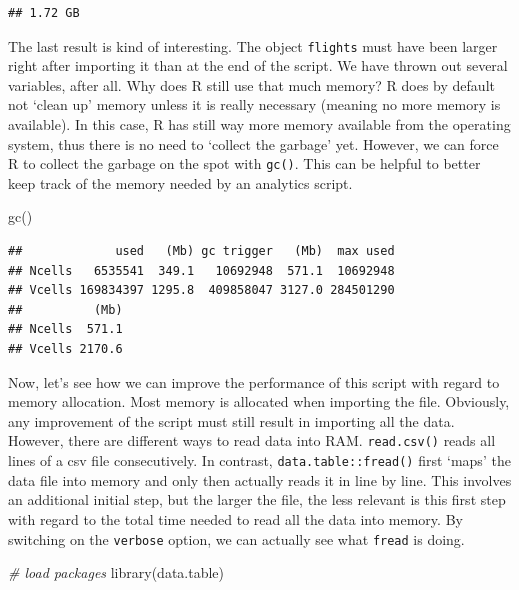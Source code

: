 \documentclass[
  12pt,
]{style/krantz}
\newenvironment{Shaded}{\begin{snugshade}}{\end{snugshade}}
\newcommand{\CommentTok}[1]{\textcolor[rgb]{0.56,0.35,0.01}{\textit{#1}}}
\newcommand{\FunctionTok}[1]{\textcolor[rgb]{0.00,0.00,0.00}{#1}}
\newcommand{\NormalTok}[1]{#1}
\begin{document}
\begin{verbatim}
## 1.72 GB
\end{verbatim}

The last result is kind of interesting. The object \texttt{flights} must have been larger right after importing it than at the end of the script. We have thrown out several variables, after all. Why does R still use that much memory? R does by default not `clean up' memory unless it is really necessary (meaning no more memory is available). In this case, R has still way more memory available from the operating system, thus there is no need to `collect the garbage' yet. However, we can force R to collect the garbage on the spot with \texttt{gc()}. This can be helpful to better keep track of the memory needed by an analytics script.

\begin{Shaded}
\begin{Highlighting}[]
\FunctionTok{gc}\NormalTok{()}
\end{Highlighting}
\end{Shaded}

\begin{verbatim}
##             used   (Mb) gc trigger   (Mb)  max used
## Ncells   6535541  349.1   10692948  571.1  10692948
## Vcells 169834397 1295.8  409858047 3127.0 284501290
##          (Mb)
## Ncells  571.1
## Vcells 2170.6
\end{verbatim}

Now, let's see how we can improve the performance of this script with regard to memory allocation. Most memory is allocated when importing the file. Obviously, any improvement of the script must still result in importing all the data. However, there are different ways to read data into RAM. \texttt{read.csv()} reads all lines of a csv file consecutively. In contrast, \texttt{data.table::fread()} first `maps' the data file into memory and only then actually reads it in line by line. This involves an additional initial step, but the larger the file, the less relevant is this first step with regard to the total time needed to read all the data into memory. By switching on the \texttt{verbose} option, we can actually see what \texttt{fread} is doing.

\begin{Shaded}
\begin{Highlighting}[]
\CommentTok{\# load packages}
\FunctionTok{library}\NormalTok{(data.table)}
\end{Highlighting}
\end{Shaded}
\end{document}
